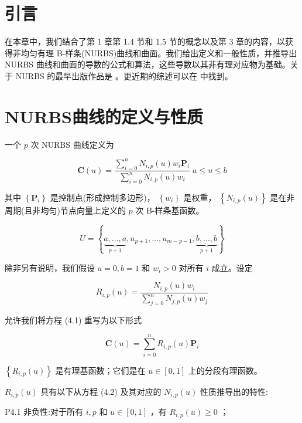 \documentclass[../main.tex]{subfiles}
\begin{document}
\section{引言}

在本章中，我们结合了第 1 章第 1.4 节和 1.5 节的概念以及第 3 章的内容，以获得非均匀有理 B-样条(NURBS)曲线和曲面。我们给出定义和一般性质，并推导出 NURBS 曲线和曲面的导数的公式和算法，这些导数以其非有理对应物为基础。关于 NURBS 的最早出版作品是 \cite{Vers75,Till83}。更近期的综述可以在 \cite{Pieg91a} 中找到。

\section{NURBS曲线的定义与性质}

一个 \(p\) 次 NURBS 曲线定义为

\[
\mathbf{C}\left( u\right)  = \frac{\mathop{\sum }\limits_{{i = 0}}^{n}{N}_{i,p}\left( u\right) {w}_{i}{\mathbf{P}}_{i}}{\mathop{\sum }\limits_{{i = 0}}^{n}{N}_{i,p}\left( u\right) {w}_{i}}\;a \leq  u \leq  b \tag{4.1}
\]

其中 \(\left\{  {\mathbf{P}}_{i}\right\}\) 是控制点(形成控制多边形)， \(\left\{  {w}_{i}\right\}\) 是权重， \(\left\{  {{N}_{i,p}\left( u\right) }\right\}\) 是在非周期(且非均匀)节点向量上定义的 \(p\) 次 B-样条基函数。

\[
U = \left\{  {\underset{p + 1}{\underbrace{a,\ldots ,a}},{u}_{p + 1},\ldots ,{u}_{m - p - 1},\underset{p + 1}{\underbrace{b,\ldots ,b}}}\right\}
\]

除非另有说明，我们假设 \(a = 0,b = 1\) 和 \({w}_{i} > 0\) 对所有 \(i\) 成立。设定

\[
{R}_{i,p}\left( u\right)  = \frac{{N}_{i,p}\left( u\right) {w}_{i}}{\mathop{\sum }\limits_{{j = 0}}^{n}{N}_{j,p}\left( u\right) {w}_{j}} \tag{4.2}
\]

允许我们将方程 (4.1) 重写为以下形式

\[
\mathbf{C}\left( u\right)  = \mathop{\sum }\limits_{{i = 0}}^{n}{R}_{i,p}\left( u\right) {\mathbf{P}}_{i} \tag{4.3}
\]

\(\left\{  {{R}_{i,p}\left( u\right) }\right\}\) 是有理基函数；它们是在 \(u \in  \left\lbrack  {0,1}\right\rbrack\) 上的分段有理函数。

\({R}_{i,p}\left( u\right)\) 具有以下从方程 (4.2) 及其对应的 \({N}_{i,p}\left( u\right)\) 性质推导出的特性:

P4.1 非负性:对于所有 \(i,p\) 和 \(u \in  \left\lbrack  {0,1}\right\rbrack\) ，有 \({R}_{i,p}\left( u\right)  \geq  0\) ；
\end{document}
